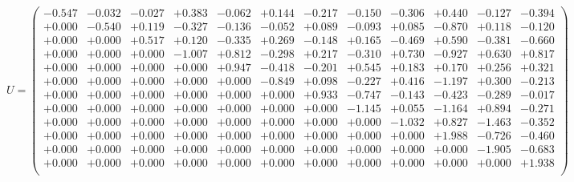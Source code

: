 \documentclass[9pt]{article}
\theoremstyle{plain}
\theoremstyle{definition}
\theoremstyle{remark}
\numberwithin{equation}{section}
\begin{document}
$U = \left(
\begin{array}{
cccccccccccc}
-0.547 & -0.032 & -0.027 & +0.383 & -0.062 & +0.144 & -0.217 & -0.150 & -0.306 & +0.440 & -0.127 & -0.394 \\
+0.000 & -0.540 & +0.119 & -0.327 & -0.136 & -0.052 & +0.089 & -0.093 & +0.085 & -0.870 & +0.118 & -0.120 \\
+0.000 & +0.000 & +0.517 & +0.120 & -0.335 & +0.269 & -0.148 & +0.165 & -0.469 & +0.590 & -0.381 & -0.660 \\
+0.000 & +0.000 & +0.000 & -1.007 & +0.812 & -0.298 & +0.217 & -0.310 & +0.730 & -0.927 & +0.630 & +0.817 \\
+0.000 & +0.000 & +0.000 & +0.000 & +0.947 & -0.418 & -0.201 & +0.545 & +0.183 & +0.170 & +0.256 & +0.321 \\
+0.000 & +0.000 & +0.000 & +0.000 & +0.000 & -0.849 & +0.098 & -0.227 & +0.416 & -1.197 & +0.300 & -0.213 \\
+0.000 & +0.000 & +0.000 & +0.000 & +0.000 & +0.000 & +0.933 & -0.747 & -0.143 & -0.423 & -0.289 & -0.017 \\
+0.000 & +0.000 & +0.000 & +0.000 & +0.000 & +0.000 & +0.000 & -1.145 & +0.055 & -1.164 & +0.894 & -0.271 \\
+0.000 & +0.000 & +0.000 & +0.000 & +0.000 & +0.000 & +0.000 & +0.000 & -1.032 & +0.827 & -1.463 & -0.352 \\
+0.000 & +0.000 & +0.000 & +0.000 & +0.000 & +0.000 & +0.000 & +0.000 & +0.000 & +1.988 & -0.726 & -0.460 \\
+0.000 & +0.000 & +0.000 & +0.000 & +0.000 & +0.000 & +0.000 & +0.000 & +0.000 & +0.000 & -1.905 & -0.683 \\
+0.000 & +0.000 & +0.000 & +0.000 & +0.000 & +0.000 & +0.000 & +0.000 & +0.000 & +0.000 & +0.000 & +1.938 \\
\end{array}
\right)$ \newline 
\end{document}
